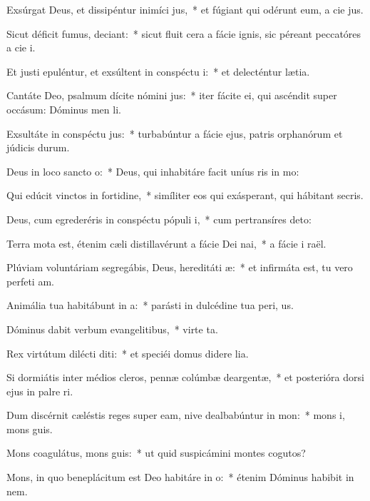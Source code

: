 \item Exsúrgat Deus, et dissipéntur inimíci jus,~* et fúgiant qui odérunt eum, a cie jus.
\item Sicut déficit fumus, deciant:~* sicut fluit cera a fácie ignis, sic péreant peccatóres a cie i.
\item Et justi epuléntur, et exsúltent in conspéctu i:~* et delecténtur  lætia.
\item Cantáte Deo, psalmum dícite nómini jus:~* iter fácite ei, qui ascéndit super occásum: Dóminus men li.
\item Exsultáte in conspéctu jus:~* turbabúntur a fácie ejus, patris orphanórum et júdicis durum.
\item Deus in loco sancto o:~* Deus, qui inhabitáre facit uníus ris in mo:
\item Qui edúcit vinctos in fortidine,~* simíliter eos qui exásperant, qui hábitant  secris.
\item Deus, cum egrederéris in conspéctu pópuli i,~* cum pertransíres  deto:
\item Terra mota est, étenim cæli distillavérunt a fácie Dei nai,~* a fácie i raël.
\item Plúviam voluntáriam segregábis, Deus, hereditáti æ:~* et infirmáta est, tu vero perfeti am.
\item Animália tua habitábunt in a:~* parásti in dulcédine tua peri, us.
\item Dóminus dabit verbum evangelitibus,~* virte ta.
\item Rex virtútum dilécti diti:~* et speciéi domus didere lia.
\item Si dormiátis inter médios cleros, pennæ colúmbæ deargentæ,~* et posterióra dorsi ejus in palre ri.
\item Dum discérnit cæléstis reges super eam, nive dealbabúntur in mon:~* mons i, mons guis.
\item Mons coagulátus, mons guis:~* ut quid suspicámini montes cogutos?
\item Mons, in quo beneplácitum est Deo habitáre in o:~* étenim Dóminus habibit in nem.
